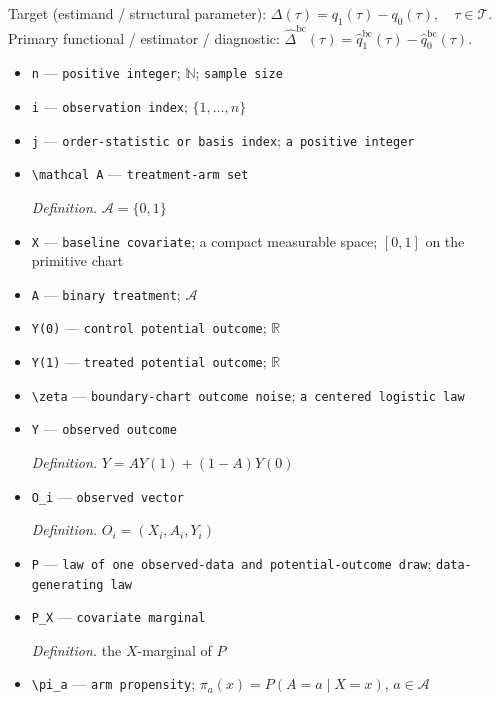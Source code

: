 \documentclass{article}
\begin{document}
Target (estimand / structural parameter): \(\Delta(\tau)=q_1(\tau)-q_0(\tau),\quad\tau\in\mathcal T\).
Primary functional / estimator / diagnostic: \(\widehat\Delta^{\mathrm{bc}}(\tau)=\widehat q_1^{\mathrm{bc}}(\tau)-\widehat q_0^{\mathrm{bc}}(\tau)\).
\begin{itemize}
  \item \texttt{n} --- \texttt{positive integer}; \(\mathbb N\); \texttt{sample size}
  \item \texttt{i} --- \texttt{observation index}; \(\{1,\ldots,n\}\)
  \item \texttt{j} --- \texttt{order-\allowbreak{}statistic or basis index}; \texttt{a positive integer}
  \item \texttt{\textbackslash{}\allowbreak{}mathcal A} --- \texttt{treatment-\allowbreak{}arm set}
  \par\smallskip\noindent\emph{Definition.} \(\mathcal A=\{0,1\}\)
  \item \texttt{X} --- \texttt{baseline covariate}; a compact measurable space; \([0,1]\) on the primitive chart
  \item \texttt{A} --- \texttt{binary treatment}; \(\mathcal A\)
  \item \texttt{Y(0)} --- \texttt{control potential outcome}; \(\mathbb R\)
  \item \texttt{Y(1)} --- \texttt{treated potential outcome}; \(\mathbb R\)
  \item \texttt{\textbackslash{}\allowbreak{}zeta} --- \texttt{boundary-\allowbreak{}chart outcome noise}; \texttt{a centered logistic law}
  \item \texttt{Y} --- \texttt{observed outcome}
  \par\smallskip\noindent\emph{Definition.} \(Y=A Y(1)+(1-A)Y(0)\)
  \item \texttt{O\_\allowbreak{}i} --- \texttt{observed vector}
  \par\smallskip\noindent\emph{Definition.} \(O_i=(X_i,A_i,Y_i)\)
  \item \texttt{P} --- \texttt{law of one observed-\allowbreak{}data and potential-\allowbreak{}outcome draw}; \texttt{data-\allowbreak{}generating law}
  \item \texttt{P\_\allowbreak{}X} --- \texttt{covariate marginal}
  \par\smallskip\noindent\emph{Definition.} the \(X\)-marginal of \(P\)
  \item \texttt{\textbackslash{}\allowbreak{}pi\_\allowbreak{}a} --- \texttt{arm propensity}; \(\pi_a(x)=P(A=a\mid X=x)\), \(a\in\mathcal A\)

\end{itemize}
\end{document}
